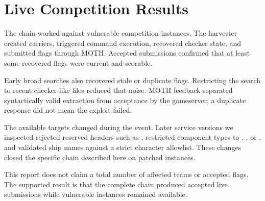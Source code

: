 \section{Live Competition Results}
\label{sec:results}

The chain worked against vulnerable competition instances. The harvester
created carriers, triggered command execution, recovered checker state,
and submitted flags through MOTH. Accepted submissions confirmed that at
least some recovered flags were current and scorable.

Early broad searches also recovered stale or duplicate flags. Restricting
the search to recent checker-like files reduced that noise. MOTH feedback
separated syntactically valid extraction from acceptance by the gameserver;
a duplicate response did not mean the exploit failed.

The available targets changed during the event. Later service versions
we inspected rejected reserved headers such as , restricted
component types to , , or , and
validated ship names against a strict character allowlist. These changes
closed the specific chain described here on patched instances.

This report does not claim a total number of affected teams or accepted
flags. The supported result is that the complete chain produced accepted
live submissions while vulnerable instances remained available.
